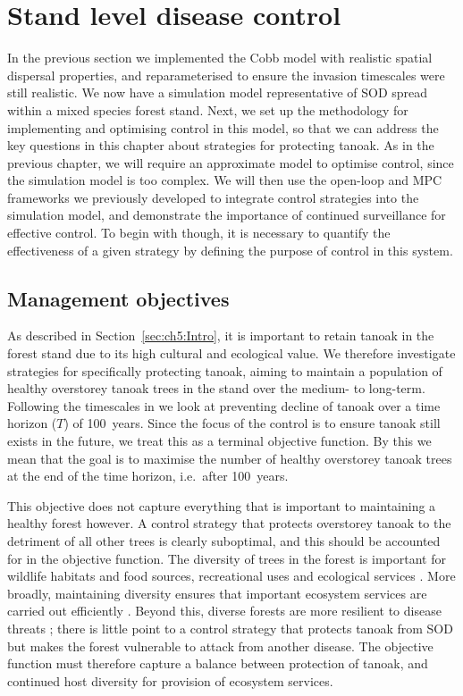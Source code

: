 \section{Stand level disease control\label{sec:ch5:control}}

In the previous section we implemented the Cobb model with realistic spatial dispersal properties, and reparameterised to ensure the invasion timescales were still realistic. We now have a simulation model representative of SOD spread within a mixed species forest stand. Next, we set up the methodology for implementing and optimising control in this model, so that we can address the key questions in this chapter about strategies for protecting tanoak. As in the previous chapter, we will require an approximate model to optimise control, since the simulation model is too complex. We will then use the open-loop and MPC frameworks we previously developed to integrate control strategies into the simulation model, and demonstrate the importance of continued surveillance for effective control. To begin with though, it is necessary to quantify the effectiveness of a given strategy by defining the purpose of control in this system.

\subsection{Management objectives}\label{sec:ch5:mgmt_objs}

As described in Section~\ref{sec:ch5:Intro}, it is important to retain tanoak in the forest stand due to its high cultural and ecological value. We therefore investigate strategies for specifically protecting tanoak, aiming to maintain a population of healthy overstorey tanoak trees in the stand over the medium- to long-term. Following the timescales in \citet{cobb_ecosystem_2012} we look at preventing decline of tanoak over a time horizon ($T$) of 100~years. Since the focus of the control is to ensure tanoak still exists in the future, we treat this as a terminal objective function. By this we mean that the goal is to maximise the number of healthy overstorey tanoak trees at the end of the time horizon, i.e.\ after 100~years.

This objective does not capture everything that is important to maintaining a healthy forest however. A control strategy that protects overstorey tanoak to the detriment of all other trees is clearly suboptimal, and this should be accounted for in the objective function. The diversity of trees in the forest is important for wildlife habitats and food sources, recreational uses and ecological services \citep{swiecki_reference_2013}. More broadly, maintaining diversity ensures that important ecosystem services are carried out efficiently \citep{cadotte_beyond_2011, gamfeldt_higher_2013}. Beyond this, diverse forests are more resilient to disease threats \citep{keesing_impacts_2010}; there is little point to a control strategy that protects tanoak from SOD but makes the forest vulnerable to attack from another disease. The objective function must therefore capture a balance between protection of tanoak, and continued host diversity for provision of ecosystem services.

